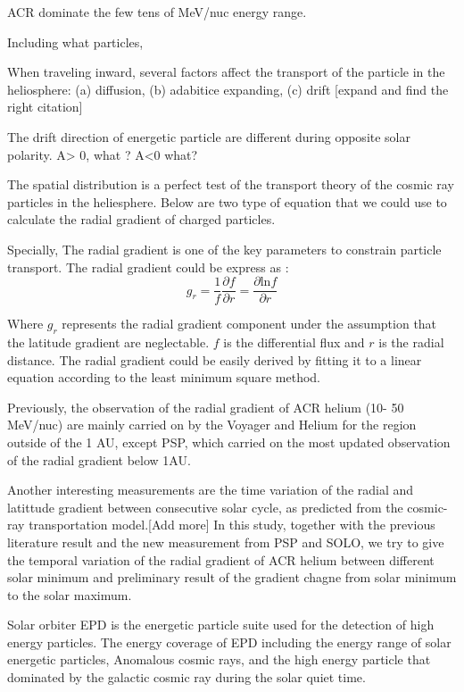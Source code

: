 ACR dominate the few tens of MeV/nuc energy range.

Including what particles,

When traveling inward, several factors affect the transport of the particle in the heliosphere: (a) diffusion, (b) adabitice expanding,  (c) drift  [expand and find the right citation]

The drift direction of energetic particle are different during opposite solar polarity. A> 0, what ? A<0 what? 


The spatial distribution is a perfect test of the transport theory of the cosmic ray particles in the heliesphere.
Below are two type of equation that we could use to calculate the radial gradient of charged particles.



Specially, The radial gradient is one of the key parameters to constrain particle transport. The radial gradient could be express as \cite{Rankin2021ApJ...912..139R} :
\begin{equation}
    g_r = \frac{1}{f}\frac{\partial{f}}{\partial{r}} = \frac{\partial{\mathrm{ln} f}}{\partial{r}}
\end{equation}

Where $g_r$ represents the radial gradient component under the assumption that the latitude gradient are neglectable. $f$ is the differential flux and $r$ is the radial distance. The radial gradient could be easily derived by fitting it to a linear equation according to the least minimum square method.

Previously, the observation of the radial gradient of ACR helium (10- 50 MeV/nuc) are mainly carried on by the Voyager and Helium for the region outside of the 1 AU, except PSP, which carried on the most updated observation of the radial gradient below 1AU.


Another interesting measurements are the time variation of the radial and latittude gradient between consecutive solar cycle, as predicted from the cosmic-ray transportation model.[Add more]  In this study, together with the previous literature result and the new measurement from PSP and SOLO, we try to give the temporal variation of the radial gradient of ACR helium between different solar minimum and preliminary result of the gradient chagne from solar minimum to the solar maximum.


Solar orbiter EPD is the energetic particle suite used for the detection of high energy particles. The energy coverage of EPD including the energy range of solar energetic particles, Anomalous cosmic rays, and the high energy particle that dominated by the galactic cosmic ray during the solar quiet time.

